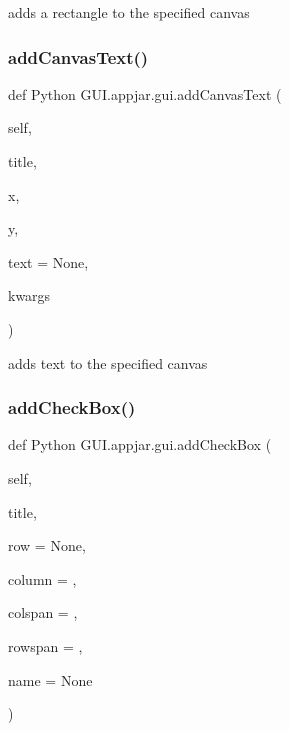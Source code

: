 \begin{DoxyVerb}adds a rectangle to the specified canvas \end{DoxyVerb}
 \mbox{\label{class_python_01_g_u_i_1_1appjar_1_1gui_aba1d445ab869c09e8841340ae7f3d59e}} 
\subsubsection{\texorpdfstring{add\+Canvas\+Text()}{addCanvasText()}}
{\footnotesize\ttfamily def Python G\+U\+I.\+appjar.\+gui.\+add\+Canvas\+Text (\begin{DoxyParamCaption}\item[{}]{self,  }\item[{}]{title,  }\item[{}]{x,  }\item[{}]{y,  }\item[{}]{text = {\ttfamily None},  }\item[{}]{kwargs }\end{DoxyParamCaption})}

\begin{DoxyVerb}adds text to the specified canvas \end{DoxyVerb}
 \mbox{\label{class_python_01_g_u_i_1_1appjar_1_1gui_a3ff3e39fe6eb3d563f8cfd4bd8299903}} 
\subsubsection{\texorpdfstring{add\+Check\+Box()}{addCheckBox()}}
{\footnotesize\ttfamily def Python G\+U\+I.\+appjar.\+gui.\+add\+Check\+Box (\begin{DoxyParamCaption}\item[{}]{self,  }\item[{}]{title,  }\item[{}]{row = {\ttfamily None},  }\item[{}]{column = {},  }\item[{}]{colspan = {},  }\item[{}]{rowspan = {},  }\item[{}]{name = {\ttfamily None} }\end{DoxyParamCaption})}


